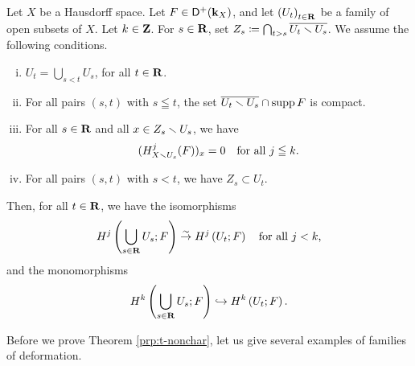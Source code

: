 \begin{Theorem+}\label{prp:t-nonchar}
  Let \(X\) be a Hausdorff space. 
  Let \(F\in\mathop{\mathsf{D}^\mathrm{+}}\nolimits(\mathbf{k}_X)\), and let
  \(\left(U_{t}\right)_{t\in\mathbf{R}}\) be a family of 
  open subsets of \(X\). 
  Let \(k\in\mathbf{Z}\). 
  For \(s\in\mathbf{R}\), set \(
    Z_{s}\coloneqq \bigcap_{t>s}\overline{U_t\smallsetminus U_s}
  \). 
  We assume the following conditions. 
  \begin{enumerate}[(i)]
    \item \label{item:t-nonchar1}
    \(U_{t}=\bigcup_{s<t}U_{s}\), for all \(t\in\mathbf{R}\). 
    \item \label{item:t-nonchar2}
    For all pairs \((s,t)\) with \(s\leqq t\), 
    the set \(\overline{U_{t}\smallsetminus U_{s}}\cap \mathop{\mathrm{supp}}\nolimits{F}\) is compact.
    \item \label{item:t-nonchar3}
    For all \(s\in\mathbf{R}\) and all \(x\in Z_{s}\smallsetminus U_{s}\), 
    we have\[
      (H^{j}_{X\smallsetminus U_{s}}(F))_{x}=0
      \quad 
      \text{for all \(j\leqq k\).}
    \]
    \item \label{item:t-nonchar4} 
    For all pairs \((s,t)\) with \(s< t\), we have \(Z_s\subset U_{t}\).
  \end{enumerate}
  Then, for all \(t\in\mathbf{R}\), we have the isomorphisms\[
    H^{j}\left(\bigcup_{s\in\mathbf{R}}U_{s};F\right)
    \mathrel{\overset{\sim}{\rightarrow}} 
    H^{j}\left(U_{t};F\right)
    \quad \text{for all \(j< k\),} 
  \]
  and the monomorphisms \[
    H^{k}\left(\bigcup_{s\in\mathbf{R}}U_{s};F\right)
    \hookrightarrow 
    H^{k}\left(U_{t};F\right).
  \] 
\end{Theorem+}

Before we prove Theorem \ref{prp:t-nonchar}, 
let us give several examples of families of deformation. 


